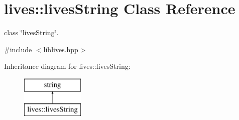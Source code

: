\hypertarget{classlives_1_1livesString}{\section{lives\-:\-:lives\-String Class Reference}
\label{classlives_1_1livesString}
}


class \char`\"{}lives\-String\char`\"{}.  




{\ttfamily \#include $<$liblives.\-hpp$>$}

Inheritance diagram for lives\-:\-:lives\-String\-:\begin{figure}[H]
\begin{center}
\leavevmode
\includegraphics[height=2.000000cm]{classlives_1_1livesString}
\end{center}
\end{figure}
